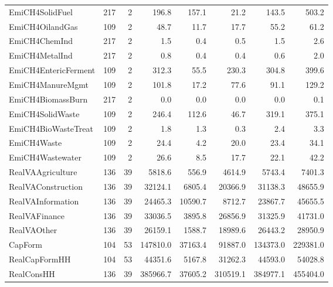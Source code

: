 {\begin{tabular}[t]{lrrrrrrr}
EmiCH4SolidFuel & 217 & 2 & \num{196.8} & \num{157.1} & \num{21.2} & \num{143.5} & \num{503.2}\\
EmiCH4OilandGas & 109 & 2 & \num{48.7} & \num{11.7} & \num{17.7} & \num{55.2} & \num{61.2}\\
EmiCH4ChemInd & 217 & 2 & \num{1.5} & \num{0.4} & \num{0.5} & \num{1.5} & \num{2.6}\\
EmiCH4MetalInd & 217 & 2 & \num{0.8} & \num{0.4} & \num{0.4} & \num{0.6} & \num{2.0}\\
EmiCH4EntericFerment & 109 & 2 & \num{312.3} & \num{55.5} & \num{230.3} & \num{304.8} & \num{399.6}\\
EmiCH4ManureMgmt & 109 & 2 & \num{101.8} & \num{17.2} & \num{77.6} & \num{91.1} & \num{129.2}\\
EmiCH4BiomassBurn & 217 & 2 & \num{0.0} & \num{0.0} & \num{0.0} & \num{0.0} & \num{0.1}\\
EmiCH4SolidWaste & 109 & 2 & \num{246.4} & \num{112.6} & \num{46.7} & \num{319.1} & \num{375.1}\\
EmiCH4BioWasteTreat & 109 & 2 & \num{1.8} & \num{1.3} & \num{0.3} & \num{2.4} & \num{3.3}\\
EmiCH4Waste & 109 & 2 & \num{24.4} & \num{4.2} & \num{20.0} & \num{23.4} & \num{34.1}\\
EmiCH4Wastewater & 109 & 2 & \num{26.6} & \num{8.5} & \num{17.7} & \num{22.1} & \num{42.2}\\
RealVAAgriculture & 136 & 39 & \num{5818.6} & \num{556.9} & \num{4614.9} & \num{5743.4} & \num{7401.3}\\
RealVAConstruction & 136 & 39 & \num{32124.1} & \num{6805.4} & \num{20366.9} & \num{31138.3} & \num{48655.9}\\
RealVAInformation & 136 & 39 & \num{24465.3} & \num{10590.7} & \num{8712.7} & \num{23867.7} & \num{45655.5}\\
RealVAFinance & 136 & 39 & \num{33036.5} & \num{3895.8} & \num{26856.9} & \num{31325.9} & \num{41731.0}\\
RealVAOther & 136 & 39 & \num{26159.1} & \num{1588.7} & \num{18989.6} & \num{26443.2} & \num{28950.9}\\
CapForm & 104 & 53 & \num{147810.0} & \num{37163.4} & \num{91887.0} & \num{134373.0} & \num{229381.0}\\
RealCapFormHH & 104 & 53 & \num{44351.6} & \num{5167.8} & \num{31262.3} & \num{44593.0} & \num{54028.8}\\
RealConsHH & 136 & 39 & \num{385966.7} & \num{37605.2} & \num{310519.1} & \num{384977.1} & \num{455404.0}\\

\end{tabular}}
